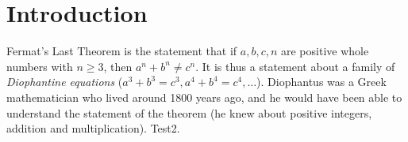 \chapter{Introduction}

Fermat's Last Theorem is the statement that if $a,b,c,n$ are positive whole numbers with $n\geq 3$, then $a^n+b^n\not=c^n$. It is thus a statement about a family of \emph{Diophantine equations} ($a^3+b^3=c^3, a^4+b^4=c^4,\ldots$). Diophantus was a Greek mathematician who lived around 1800 years ago, and he would have been able to understand the statement of the theorem (he knew about positive integers, addition and multiplication). Test2.

